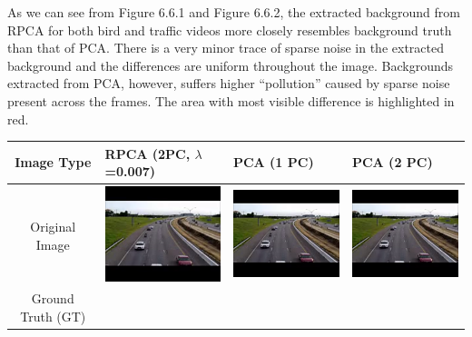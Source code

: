 \documentclass[11pt]{scrartcl} %
\theoremstyle{plain}
\begin{document}
As we can see from Figure 6.6.1 and Figure 6.6.2, the extracted background from RPCA for both bird and traffic videos more closely resembles background truth than that of PCA. There is a very minor trace of sparse noise in the extracted background and the differences are uniform throughout the image. Backgrounds extracted from PCA, however, suffers higher “pollution” caused by sparse noise present across the frames. The area with most visible difference is highlighted in red.

\bigskip
\begin{minipage}{\linewidth}
\bgroup
  \begin{tabular}{ | c | m{2.8cm} | m{2.8cm} | m{2.8cm} | }
    \hline
    Image Type & RPCA \linebreak (2PC, $\lambda$=0.007) & PCA \linebreak (1 PC) & PCA \linebreak (2 PC)
    \\ \hline
	Original \linebreak Image
    &
    \begin{minipage}{.3\textwidth}
      \includegraphics[width=\linewidth, width=25mm]{figures_video/traffic/original.png}
    \end{minipage}
    & 
    \begin{minipage}{.3\textwidth}
      \includegraphics[width=\linewidth, width=25mm]{figures_video/traffic/original.png}
    \end{minipage}
    &
    \begin{minipage}{.3\textwidth}
      \includegraphics[width=\linewidth, width=25mm]{figures_video/traffic/original.png}
    \end{minipage}
    \\[5ex] \hline
	Ground Truth (GT)
	&
    \begin{minipage}{.3\textwidth}

\end{minipage}
\end{tabular}
\end{minipage}
\end{document}
